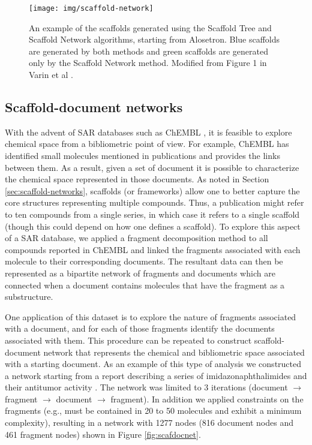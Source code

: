 \documentclass[]{book}
\begin{document}
\begin{figure}[h]
  \centering
  \texttt{[image: img/scaffold-network]}
  \caption{An example of the scaffolds generated using
  the Scaffold Tree and Scaffold Network algorithms, starting from
  Alosetron. Blue scaffolds are generated by both methods and green
  scaffolds are generated only by the Scaffold Network
  method. Modified from Figure 1 in Varin et al \cite{Varin:2011ve}.}
  \label{fig:scaffnet}
\end{figure}

\subsection{Scaffold-document networks}
\label{sec:scaff-docum-netw}

With the advent of SAR databases such as ChEMBL \cite{Gaulton:2012jl},
it is feasible to explore chemical space from a bibliometric point of
view. For example, ChEMBL has identified small molecules mentioned in
publications and provides the links between them. As a result, given a
set of document it is possible to characterize the chemical space
represented in those documents. As noted in Section
\ref{sec:scaffold-networks}, scaffolds (or frameworks) allow one to
better capture the core structures representing multiple
compounds. Thus, a publication might refer to ten compounds from a
single series, in which case it refers to a single scaffold (though
this could depend on how one defines a scaffold). To explore this
aspect of a SAR database, we applied a fragment decomposition method
to all compounds reported in ChEMBL and linked the fragments
associated with each molecule to their corresponding documents. The
resultant data can then be represented as a bipartite network of
fragments and documents which are connected when a document contains
molecules that have the fragment as a substructure. 

One application of this dataset is to explore the nature of fragments
associated with a document, and for each of those fragments identify
the documents associated with them. This procedure can be repeated to
construct scaffold-document network that represents the chemical and
bibliometric space associated with a starting document. As an example
of this type of analysis we constructed a network starting from a
report describing a series of imidazonaphthalimides and their
antitumor activity \cite{Brana:2002pr}. The network was limited to 3
iterations (document $\rightarrow$ fragment $\rightarrow$ document
$\rightarrow$ fragment). In addition we applied constraints on the
fragments (e.g., must be contained in 20 to 50 molecules and exhibit a
minimum complexity), resulting in a network with 1277 nodes (816
document nodes and 461 fragment nodes) shown in Figure
\ref{fig:scafdocnet}. 
\end{document}
